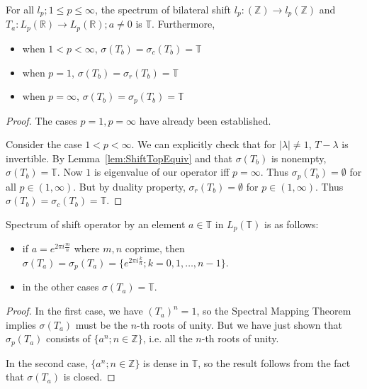 \begin{proposition}
	\label{prop:SpectBiShift}
	For all $l_p; 1 \le p \le \infty $, the spectrum of bilateral shift $l_p:(\mathbb{Z}) \to l_p(\mathbb{Z})$ and $T_a:L_p(\mathbb{R}) \to L_p(\mathbb{R}); a \neq 0$ is $\mathbb{T}$. Furthermore,
	\begin{itemize}
		\item when $1 < p < \infty $, $\sigma(T_b) = \sigma_c(T_b) = \mathbb{T}$
		\item when $p=1 $, $\sigma(T_b) = \sigma_r(T_b) = \mathbb{T}$
		\item when $p=\infty  $, $\sigma(T_b) = \sigma_p(T_b) = \mathbb{T}$
	\end{itemize}
\end{proposition}
\begin{proof}
	The cases $p = 1, p = \infty $ have already been established.

	Consider the case $1 < p < \infty $. We can explicitly check that for $|\lambda|\neq 1$, $T - \lambda$ is invertible. By Lemma~\ref{lem:ShiftTopEquiv} and that $\sigma(T_b)$ is nonempty, $\sigma(T_b) = \mathbb{T}$. Now $1$ is eigenvalue of our operator iff $p = \infty $. Thus $\sigma_p(T_b) = \emptyset $ for all $p \in (1, \infty )$. But by duality property, $\sigma_r(T_b) = \emptyset $ for $p \in (1, \infty )$. Thus $\sigma(T_b) = \sigma_c(T_b) = \mathbb{T}$. 
\end{proof}

\begin{proposition}
	\label{prop:SpectTShift}
	Spectrum of shift operator by an element $a \in \mathbb{T}$ in $L_p(\mathbb{T})$ is as follows:
	\begin{itemize}
		\item if $a = e^{2 \pi i \frac{m}{n}}$ where $m, n$ coprime, then $\sigma(T_a) = \sigma_p(T_a) = \{e^{2 \pi i \frac{k}{n}}; k = 0, 1, \ldots, n - 1\} $.
		\item in the other cases $\sigma(T_a) = \mathbb{T}$.
	\end{itemize}
\end{proposition}
\begin{proof}
	In the first case, we have $(T_a)^n = 1$, so the Spectral Mapping Theorem implies $\sigma(T_a)$ must be the $n$-th roots of unity. But we have just shown that $\sigma_p(T_a)$ consists of $\{a^n; n \in \mathbb{Z}\} $, i.e. all the $n$-th roots of unity.

	In the second case, $\{a^n; n \in \mathbb{Z}\} $ is dense in $\mathbb{T}$, so the result follows from the fact that $\sigma(T_a)$ is closed.
\end{proof}

